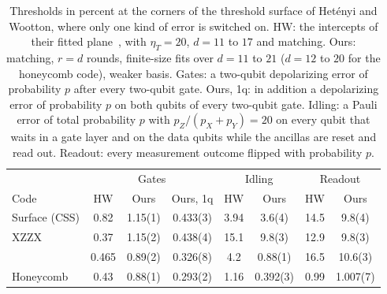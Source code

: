 \begin{table}[t]
  \setlength{\tabcolsep}{1.6pt}
  \footnotesize
  \begin{ruledtabular}
  \begin{tabular}{lccccccc}
    & \multicolumn{3}{c}{Gates} & \multicolumn{2}{c}{Idling} & \multicolumn{2}{c}{Readout} \\
    Code & HW & Ours & Ours, 1q & HW & Ours & HW & Ours \\
    \hline
    Surface (CSS) & 0.82 & 1.15(1) & 0.433(3) & 3.94 & 3.6(4) & 14.5 & 9.8(4) \\
    XZZX & 0.37 & 1.15(2) & 0.438(4) & 15.1 & 9.8(3) & 12.9 & 9.8(3) \\
    \XYZ{} & 0.465 & 0.89(2) & 0.326(8) & 4.2 & 0.88(1) & 16.5 & 10.6(3) \\
    Honeycomb & 0.43 & 0.88(1) & 0.293(2) & 1.16 & 0.392(3) & 0.99 & 1.007(7) \\
  \end{tabular}
  \end{ruledtabular}
  \caption{Thresholds in percent at the corners of the threshold surface of Het\'enyi and Wootton, where only one kind of error is switched on. HW: the intercepts of their fitted plane~\cite{hetenyi2024spin}, with $\eta_T=20$, $d=11$ to $17$ and matching. Ours: matching, $r=d$ rounds, finite-size fits over $d=11$ to $21$ ($d=12$ to $20$ for the honeycomb code), weaker basis. Gates: a two-qubit depolarizing error of probability $p$ after every two-qubit gate. Ours, 1q: in addition a depolarizing error of probability $p$ on both qubits of every two-qubit gate. Idling: a Pauli error of total probability $p$ with $p_Z/(p_X+p_Y)=20$ on every qubit that waits in a gate layer and on the data qubits while the ancillas are reset and read out. Readout: every measurement outcome flipped with probability $p$.}
  \label{tab:hw_corners}
\end{table}

